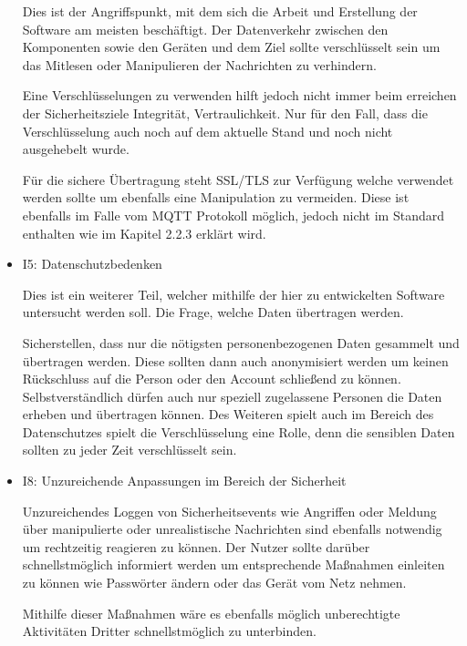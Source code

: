 \begin{itemize}
        Dies ist der Angriffspunkt, mit dem sich die Arbeit und Erstellung der Software am meisten beschäftigt.
        Der Datenverkehr zwischen den Komponenten sowie den Geräten und dem Ziel sollte verschlüsselt sein um das Mitlesen oder Manipulieren der Nachrichten zu verhindern.
        
        Eine Verschlüsselungen zu verwenden hilft jedoch nicht immer beim erreichen der Sicherheitsziele Integrität, Vertraulichkeit. Nur für den Fall, dass die Verschlüsselung auch noch auf dem aktuelle Stand und noch nicht ausgehebelt wurde. %
        
        Für die sichere Übertragung steht SSL/TLS zur Verfügung welche verwendet werden sollte um ebenfalls eine Manipulation zu vermeiden. Diese ist ebenfalls im Falle vom \ac{MQTT} Protokoll möglich, jedoch nicht im Standard enthalten wie im Kapitel 2.2.3 erklärt wird.
        
        \item I5: Datenschutzbedenken
        
        Dies ist ein weiterer Teil, welcher mithilfe der hier zu entwickelten Software untersucht werden soll. Die Frage, welche Daten übertragen werden.
        
        Sicherstellen, dass nur die nötigsten personenbezogenen Daten gesammelt und übertragen werden. Diese sollten dann auch anonymisiert werden um keinen Rückschluss auf die Person oder den Account schließend zu können.
        Selbstverständlich dürfen auch nur speziell zugelassene Personen die Daten erheben und übertragen können.
        Des Weiteren spielt auch im Bereich des Datenschutzes spielt die Verschlüsselung eine Rolle, denn die sensiblen Daten sollten zu jeder Zeit verschlüsselt sein.

        \item I8: Unzureichende Anpassungen im Bereich der Sicherheit
        
        Unzureichendes Loggen von Sicherheitsevents wie Angriffen oder Meldung über manipulierte oder unrealistische Nachrichten sind ebenfalls notwendig um rechtzeitig reagieren zu können. Der Nutzer sollte darüber schnellstmöglich informiert werden um entsprechende Maßnahmen einleiten zu können wie Passwörter ändern oder das Gerät vom Netz nehmen.
        
        Mithilfe dieser Maßnahmen wäre es ebenfalls möglich unberechtigte Aktivitäten Dritter schnellstmöglich zu unterbinden.
        
    \end{itemize}
    
